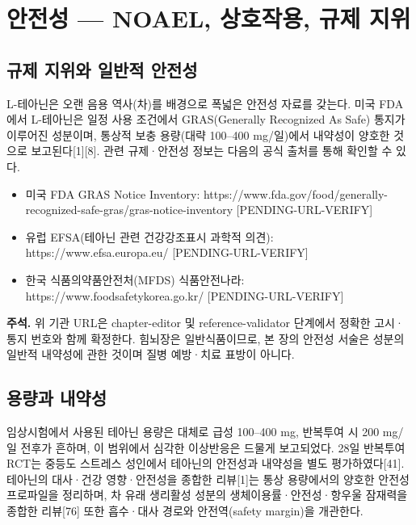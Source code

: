 \documentclass[11pt,oneside]{book}
\newenvironment{authnote}
  {\par\smallskip\begingroup\leftskip=7mm\rightskip=5mm\small\color{muted}\noindent\ignorespaces}
  {\par\endgroup\smallskip}
\begin{document}
\section{안전성 — NOAEL, 상호작용, 규제 지위}
\subsection{규제 지위와 일반적 안전성}
L-테아닌은 오랜 음용 역사(차)를 배경으로 폭넓은 안전성 자료를 갖는다. 미국 FDA에서 L-테아닌은 일정 사용 조건에서 GRAS(Generally Recognized As Safe) 통지가 이루어진 성분이며, 통상적 보충 용량(대략 100–400 mg/일)에서 내약성이 양호한 것으로 보고된다[1][8]. 관련 규제·안전성 정보는 다음의 공식 출처를 통해 확인할 수 있다.

\begin{itemize}[leftmargin=6mm,itemsep=1pt,topsep=2pt]
  \item 미국 FDA GRAS Notice Inventory: https://www.fda.gov/food/generally-recognized-safe-gras/gras-notice-inventory [PENDING-URL-VERIFY]
  \item 유럽 EFSA(테아닌 관련 건강강조표시 과학적 의견): https://www.efsa.europa.eu/ [PENDING-URL-VERIFY]
  \item 한국 식품의약품안전처(MFDS) 식품안전나라: https://www.foodsafetykorea.go.kr/ [PENDING-URL-VERIFY]
\end{itemize}
\begin{authnote}\textbf{주석.} 위 기관 URL은 chapter-editor 및 reference-validator 단계에서 정확한 고시·통지 번호와 함께 확정한다. 힘뇌장은 일반식품이므로, 본 장의 안전성 서술은 성분의 일반적 내약성에 관한 것이며 질병 예방·치료 표방이 아니다.\end{authnote}
\subsection{용량과 내약성}
임상시험에서 사용된 테아닌 용량은 대체로 급성 100–400 mg, 반복투여 시 200 mg/일 전후가 흔하며, 이 범위에서 심각한 이상반응은 드물게 보고되었다. 28일 반복투여 RCT는 중등도 스트레스 성인에서 테아닌의 안전성과 내약성을 별도 평가하였다[41]. 테아닌의 대사·건강 영향·안전성을 종합한 리뷰[1]는 통상 용량에서의 양호한 안전성 프로파일을 정리하며, 차 유래 생리활성 성분의 생체이용률·안전성·항우울 잠재력을 종합한 리뷰[76] 또한 흡수·대사 경로와 안전역(safety margin)을 개관한다.
\end{document}
